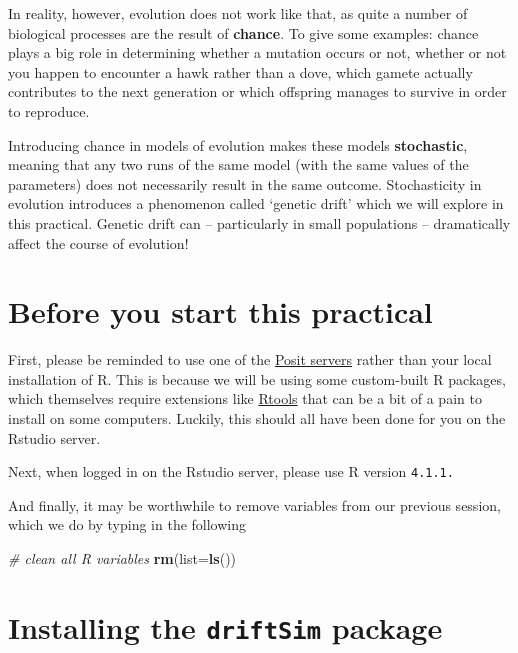 \documentclass[
]{book}
\newenvironment{Shaded}{\begin{snugshade}}{\end{snugshade}}
\newcommand{\AttributeTok}[1]{\textcolor[rgb]{0.13,0.29,0.53}{#1}}
\newcommand{\CommentTok}[1]{\textcolor[rgb]{0.56,0.35,0.01}{\textit{#1}}}
\newcommand{\FunctionTok}[1]{\textcolor[rgb]{0.13,0.29,0.53}{\textbf{#1}}}
\newcommand{\NormalTok}[1]{#1}
\begin{document}
In reality, however, evolution does not work like that, as quite a number of biological processes are the result of \textbf{chance}. To give some examples: chance plays a big role in determining whether a mutation occurs or not, whether or not you happen to encounter a hawk rather than a dove, which gamete actually contributes to the next generation or which offspring manages to survive in order to reproduce.

Introducing chance in models of evolution makes these models \textbf{stochastic}, meaning that any two runs of the same model (with the same values of the parameters) does not necessarily result in the same outcome. Stochasticity in evolution introduces a phenomenon called `genetic drift' which we will explore in this practical. Genetic drift can -- particularly in small populations -- dramatically affect the course of evolution!

\section{Before you start this practical}\label{before-you-start-this-practical}

First, please be reminded to use one of the \href{https://posit01.exeter.ac.uk}{Posit servers} rather than your local installation of R. This is because we will be using some custom-built R packages, which themselves require extensions like \href{https://cran.r-project.org/bin/windows/Rtools/}{Rtools} that can be a bit of a pain to install on some computers. Luckily, this should all have been done for you on the Rstudio server.

Next, when logged in on the Rstudio server, please use R version \texttt{4.1.1.}

And finally, it may be worthwhile to remove variables from our previous session, which we do by typing in the following

\begin{Shaded}
\begin{Highlighting}[]
\CommentTok{\# clean all R variables}
\FunctionTok{rm}\NormalTok{(}\AttributeTok{list=}\FunctionTok{ls}\NormalTok{())}
\end{Highlighting}
\end{Shaded}

\section{\texorpdfstring{Installing the \texttt{driftSim} package}{Installing the driftSim package}}\label{installing-the-driftsim-package}
\end{document}

